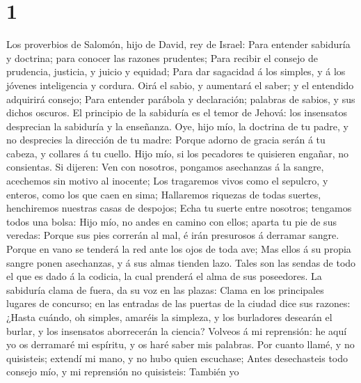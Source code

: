 \hypertarget{section}{%
\section{1}\label{section}}

 Los proverbios de Salomón, hijo de David, rey de Israel:
 Para entender sabiduría y doctrina; para conocer las
razones prudentes;  Para recibir el consejo de prudencia,
justicia, y juicio y equidad;  Para dar sagacidad á los
simples, y á los jóvenes inteligencia y cordura.  Oirá el
sabio, y aumentará el saber; y el entendido adquirirá consejo;
 Para entender parábola y declaración; palabras de sabios,
y sus dichos oscuros.  El principio de la sabiduría es el
temor de Jehová: los insensatos desprecian la sabiduría y la enseñanza.
 Oye, hijo mío, la doctrina de tu padre, y no desprecies
la dirección de tu madre:  Porque adorno de gracia serán á
tu cabeza, y collares á tu cuello.  Hijo mío, si los
pecadores te quisieren engañar, no consientas.  Si
dijeren: Ven con nosotros, pongamos asechanzas á la sangre, acechemos
sin motivo al inocente;  Los tragaremos vivos como el
sepulcro, y enteros, como los que caen en sima; 
Hallaremos riquezas de todas suertes, henchiremos nuestras casas de
despojos;  Echa tu suerte entre nosotros; tengamos todos
una bolsa:  Hijo mío, no andes en camino con ellos;
aparta tu pie de sus veredas:  Porque sus pies correrán
al mal, é irán presurosos á derramar sangre.  Porque en
vano se tenderá la red ante los ojos de toda ave;  Mas
ellos á su propia sangre ponen asechanzas, y á sus almas tienden lazo.
 Tales son las sendas de todo el que es dado á la
codicia, la cual prenderá el alma de sus poseedores.  La
sabiduría clama de fuera, da su voz en las plazas:  Clama
en los principales lugares de concurso; en las entradas de las puertas
de la ciudad dice sus razones:  ¿Hasta cuándo, oh
simples, amaréis la simpleza, y los burladores desearán el burlar, y los
insensatos aborrecerán la ciencia?  Volveos á mi
reprensión: he aquí yo os derramaré mi espíritu, y os haré saber mis
palabras.  Por cuanto llamé, y no quisisteis; extendí mi
mano, y no hubo quien escuchase;  Antes desechasteis todo
consejo mío, y mi reprensión no quisisteis:  También yo
